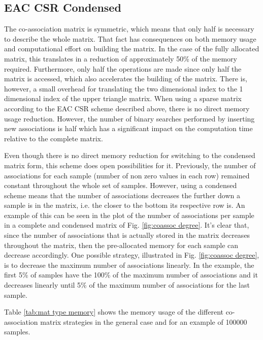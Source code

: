 \subsection{EAC CSR Condensed}

The co-association matrix is symmetric, which means that only half is necessary to describe the whole matrix.
That fact has consequences on both memory usage and computational effort on building the matrix.
In the case of the fully allocated matrix, this translates in a reduction of approximately 50\% of the memory required.
Furthermore, only half the operations are made since only half the matrix is accessed, which also accelerates the building of the matrix.
There is, however, a small overhead for translating the two dimensional index to the 1 dimensional index of the upper triangle matrix.
When using a sparse matrix according to the EAC CSR scheme described above, there is no direct memory usage reduction.
However, the number of binary searches performed by inserting new associations is half which has a significant impact on the computation time relative to the complete matrix.

Even though there is no direct memory reduction for switching to the condensed matrix form, this scheme does open possibilities for it.
Previously, the number of associations for each sample (number of non zero values in each row) remained constant throughout the whole set of samples.
However, using a condensed scheme means that the number of associations decreases the further down a sample is in the matrix, i.e. the closer to the bottom its respective row is.
An example of this can be seen in the plot of the number of associations per sample in a complete and condensed matrix of Fig. \ref{fig:coassoc degree}.
It's clear that, since the number of associations that is actually stored in the matrix decreases throughout the matrix, then the pre-allocated memory for each sample can decrease accordingly.
One possible strategy, illustrated in Fig. \ref{fig:coassoc degree}, is to decrease the maximum number of associations linearly.
In the example, the first 5\% of samples have the 100\% of the maximum number of associations and it decreases linearly until 5\% of the maximum number of associations for the last sample.

Table \ref{tab:mat type memory} shows the memory usage of the different co-association matrix strategies in the general case and for an example of 100000 samples.

